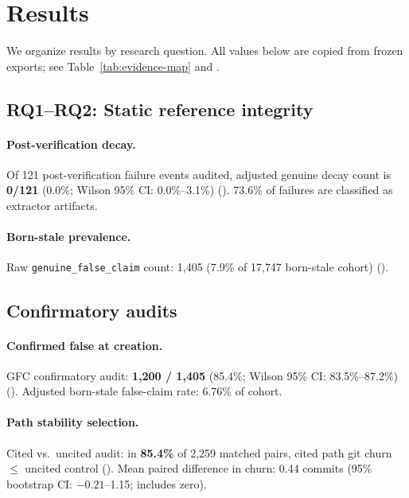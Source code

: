 \section{Results}
\label{sec:results}

We organize results by research question.
All values below are copied from frozen exports; see Table~\ref{tab:evidence-map} and .



\subsection{RQ1--RQ2: Static reference integrity}
\paragraph{Post-verification decay.}
Of 121 post-verification failure events audited, adjusted genuine decay count is \textbf{0/121} (0.0\%; Wilson 95\% CI: 0.0\%--3.1\%) ().
73.6\% of failures are classified as extractor artifacts.

\paragraph{Born-stale prevalence.}
Raw \texttt{genuine\_false\_claim} count: 1{,}405 (7.9\% of 17{,}747 born-stale cohort) ().

\subsection{Confirmatory audits}
\paragraph{Confirmed false at creation.}
GFC confirmatory audit: \textbf{1{,}200 / 1{,}405} (85.4\%; Wilson 95\% CI: 83.5\%--87.2\%) ().
Adjusted born-stale false-claim rate: 6.76\% of cohort.

\paragraph{Path stability selection.}
Cited vs.\ uncited audit: in \textbf{85.4\%} of 2{,}259 matched pairs, cited path git churn $\leq$ uncited control ().
Mean paired difference in churn: 0.44 commits (95\% bootstrap CI: $-0.21$--1.15; includes zero).

